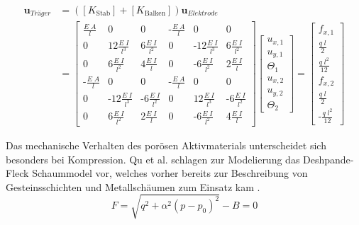  \begin{align}
    [K_{\text{Elektrode}}] \boldsymbol{u}_{Träger} &= ([K_{\text{Stab}}] + [K_{\text{Balken}}])\boldsymbol{u}_{Elektrode}\\
    &= 
    \begin{bmatrix}
        \frac{E \; A}{l} & 0     & 0     &  \text{-}\frac{E \; A}{l}  & 0 & 0 \\
        0 & 12 \frac{E \; I}{l^3}     & 6 \frac{E \; I}{l^2} & 0    &\text{-}12\frac{E \; I}{l^3}  & 6 \frac{E \; I}{l^2}       \\
        0 & 6 \frac{E \; I}{l^2} & 4 \frac{E \; I}{l}  & 0    & \text{-}6 \frac{E \; I}{l^2}  & 2 \frac{E \; I}{l} \\
        \text{-}\frac{E \; A}{l} & 0     & 0     &  \text{-}\frac{E \; A}{l}  & 0 & 0 \\
        0 & \text{-}12\frac{E \; I}{l^3}    & \text{-}6 \frac{E \; I}{l^2}& 0 &12\frac{E \; I}{l^3}   & \text{-}6 \frac{E \; I}{l^2}      \\
        0 & 6 \frac{E \; I}{l^2} & 2 \frac{E \; I}{l} & 0    & \text{-}6 \frac{E \; I}{l^2} & 4 \frac{E \; I}{l}
    \end{bmatrix}
    \begin{bmatrix}
        u_{x,1}  \\
        u_{y,1}  \\
        \Theta_1 \\
        u_{x,2}  \\
        u_{y,2}  \\
        \Theta_2
    \end{bmatrix}
    = 
    \begin{bmatrix}
        f_{x,1} \\
        \frac{q \; l}{2}  \\
        \frac{q \; l^2}{12} \\
        f_{x,2} \\
        \frac{q \; l}{2}  \\
        \text{-}\frac{q \; l^2}{12}
    \end{bmatrix} 
 \end{align}



Das mechanische Verhalten des porösen Aktivmaterials unterscheidet sich besonders bei Kompression. Qu et al.  schlagen zur Modelierung das Deshpande-Fleck Schaummodel \cite{Deshpande2000} vor, welches vorher bereits zur Beschreibung von Gesteinsschichten und Metallschäumen zum Einsatz kam \cite{Qu2023}.
\begin{equation}
    F = \sqrt{q^2 + \alpha^2 (p-p_0)^2} - B = 0
\end{equation}

